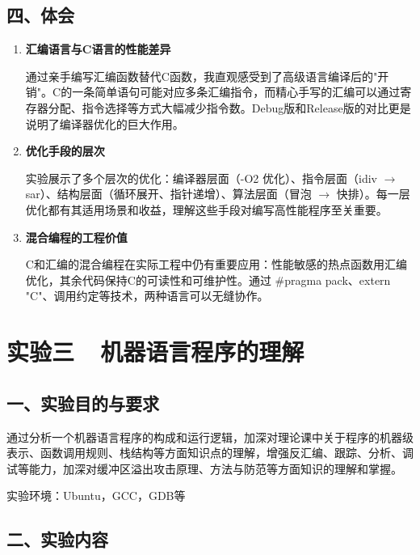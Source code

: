\documentclass[12pt,a4paper]{ctexart}
\begin{document}
\subsection*{四、体会}

\begin{enumerate}[label=\arabic*.]
    \item \textbf{汇编语言与C语言的性能差异}

    通过亲手编写汇编函数替代C函数，我直观感受到了高级语言编译后的"开销"。C的一条简单语句可能对应多条汇编指令，而精心手写的汇编可以通过寄存器分配、指令选择等方式大幅减少指令数。Debug版和Release版的对比更是说明了编译器优化的巨大作用。

    \item \textbf{优化手段的层次}

    实验展示了多个层次的优化：编译器层面（-O2 优化）、指令层面（idiv $\to$ sar）、结构层面（循环展开、指针递增）、算法层面（冒泡 $\to$ 快排）。每一层优化都有其适用场景和收益，理解这些手段对编写高性能程序至关重要。

    \item \textbf{混合编程的工程价值}

    C和汇编的混合编程在实际工程中仍有重要应用：性能敏感的热点函数用汇编优化，其余代码保持C的可读性和可维护性。通过 \#pragma pack、extern "C"、调用约定等技术，两种语言可以无缝协作。
\end{enumerate}

\newpage

\section*{实验三\ \ 机器语言程序的理解}

\subsection*{一、实验目的与要求}

通过分析一个机器语言程序的构成和运行逻辑，加深对理论课中关于程序的机器级表示、函数调用规则、栈结构等方面知识点的理解，增强反汇编、跟踪、分析、调试等能力，加深对缓冲区溢出攻击原理、方法与防范等方面知识的理解和掌握。

实验环境：Ubuntu，GCC，GDB等

\subsection*{二、实验内容}
\end{document}
